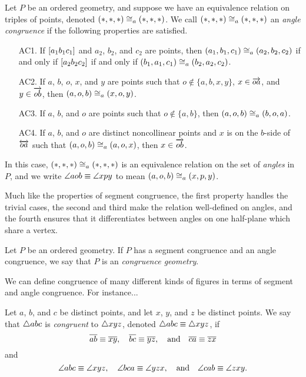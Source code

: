 \begin{dfn}
Let \(P\) be an ordered geometry, and suppose we have an equivalence relation on triples of points, denoted \((\ast,\ast,\ast) \cong_a (\ast,\ast,\ast)\).
We call \((\ast,\ast,\ast) \cong_a (\ast,\ast,\ast)\) an \emph{angle congruence} if the following properties are satisfied.
\begin{itemize}
\item[AC1.] If \([ a_1 b_1 c_1 ]\) and \(a_2\), \(b_2\), and \(c_2\) are points, then \((a_1,b_1,c_1) \cong_a (a_2,b_2,c_2)\) if and only if \([ a_2 b_2 c_2 ]\) if and only if \((b_1,a_1,c_1) \cong_a (b_2,a_2,c_2)\).
\item[AC2.] If \(a\), \(b\), \(o\), \(x\), and \(y\) are points such that \(o \notin \{a,b,x,y\}\), \(x \in \overrightarrow{oa}\), and \(y \in \overrightarrow{ob}\), then \((a,o,b) \cong_a (x,o,y)\).
\item[AC3.] If \(a\), \(b\), and \(o\) are points such that \(o \notin \{a,b\}\), then \((a,o,b) \cong_a (b,o,a)\).
\item[AC4.] If \(a\), \(b\), and \(o\) are distinct noncollinear points and \(x\) is on the \(b\)-side of \(\overleftrightarrow{oa}\) such that \((a,o,b) \cong_a (a,o,x)\), then \(x \in \overrightarrow{ob}\).
\end{itemize}
In this case, \((\ast,\ast,\ast) \cong_a (\ast,\ast,\ast)\) is an equivalence relation on the set of \emph{angles} in \(P\), and we write \(\angle{aob} \equiv \angle{xpy}\) to mean \((a,o,b) \cong_a (x,p,y)\).
\end{dfn}

Much like the properties of segment congruence, the first property handles the trivial cases, the second and third make the relation well-defined on angles, and the fourth ensures that it differentiates between angles on one half-plane which share a vertex.

\begin{dfn}
Let \(P\) be an ordered geometry.
If \(P\) has a segment congruence and an angle congruence, we say that \(P\) is an \emph{congruence geometry}.
\end{dfn}

We can define congruence of many different kinds of figures in terms of segment and angle congruence.
For instance...

\begin{dfn}
Let \(a\), \(b\), and \(c\) be distinct points, and let \(x\), \(y\), and \(z\) be distinct points.
We say that \(\bigtriangleup{abc}\) is \emph{congruent} to \(\bigtriangleup{xyz}\), denoted \(\bigtriangleup{abc} \equiv \bigtriangleup{xyz}\), if \[ \overline{ab} \equiv \overline{xy}, \quad \overline{bc} \equiv \overline{yz}, \quad \mathrm{and} \quad \overline{ca} \equiv \overline{zx} \] and \[ \angle{abc} \equiv \angle{xyz}, \quad \angle{bca} \equiv \angle{yzx}, \quad \mathrm{and} \quad \angle{cab} \equiv \angle{zxy}. \]
\end{dfn}


